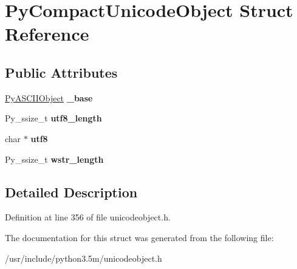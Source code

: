 \hypertarget{structPyCompactUnicodeObject}{}\section{Py\+Compact\+Unicode\+Object Struct Reference}
\label{structPyCompactUnicodeObject}
\subsection*{Public Attributes}
\begin{DoxyCompactItemize}
\item 
\hyperlink{structPyASCIIObject}{Py\+A\+S\+C\+I\+I\+Object} {\bfseries \+\_\+base}\hypertarget{structPyCompactUnicodeObject_abf3850ea9052f0b7e05d37110a11e55b}{}\label{structPyCompactUnicodeObject_abf3850ea9052f0b7e05d37110a11e55b}

\item 
Py\+\_\+ssize\+\_\+t {\bfseries utf8\+\_\+length}\hypertarget{structPyCompactUnicodeObject_a1c5f0d57f526bacf8be40fe4599ecf90}{}\label{structPyCompactUnicodeObject_a1c5f0d57f526bacf8be40fe4599ecf90}

\item 
char $\ast$ {\bfseries utf8}\hypertarget{structPyCompactUnicodeObject_a11d5a93debf73f11a700a2eebe513457}{}\label{structPyCompactUnicodeObject_a11d5a93debf73f11a700a2eebe513457}

\item 
Py\+\_\+ssize\+\_\+t {\bfseries wstr\+\_\+length}\hypertarget{structPyCompactUnicodeObject_ad86f7e3e8c782e50fa1d5669c6de6280}{}\label{structPyCompactUnicodeObject_ad86f7e3e8c782e50fa1d5669c6de6280}

\end{DoxyCompactItemize}


\subsection{Detailed Description}


Definition at line 356 of file unicodeobject.\+h.



The documentation for this struct was generated from the following file\+:\begin{DoxyCompactItemize}
\item 
/usr/include/python3.\+5m/unicodeobject.\+h\end{DoxyCompactItemize}

